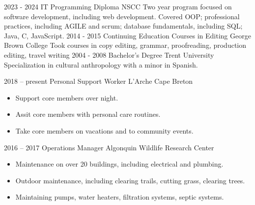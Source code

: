 \documentclass[9pt]{developercv} %
\begin{document}
\vspace{-10 pt}
\begin{entrylist}
    \entry
		{2023 - 2024}
		{IT Programming Diploma}
		{NSCC}
		{Two year program focused on software development, including web development. Covered OOP; professional practices, including AGILE and scrum; database fundamentals, including SQL; Java, C, JavaScript.}
    \entry
		{2014 - 2015}
		{Continuing Education Courses in Editing}
		{George Brown College}
		{Took courses in copy editing, grammar, proofreading, production editing, travel writing}
	\entry
		{2004 - 2008}
		{Bachelor's Degree}
		{Trent University}
		{Specialization in cultural anthropology with a minor in Spanish.}
\end{entrylist}

\vspace{-10 pt}
\begin{entrylist}
	\entry
        {2018 -- present}
		{Personal Support Worker}
		{L'Arche Cape Breton}
		{\vspace{-10pt}
        \begin{itemize}[noitemsep,topsep=0pt,parsep=0pt,partopsep=0pt, leftmargin=-1pt]
            \item Support core members over night.
            \item Assit core members with personal care routines.
            \item Take core members on vacations and to community events.
        \end{itemize} 
        \texttt{} \texttt{}}
	\entry
		{2016 -- 2017}
		{Operations Manager}
		{Algonquin Wildlife Research Center}
		{\vspace{-10pt}
        \begin{itemize}[noitemsep,topsep=0pt,parsep=0pt,partopsep=0pt, leftmargin=-1pt]
            \item Maintenance on over 20 buildings, including electrical and plumbing.
            \item Outdoor maintenance, including clearing trails, cutting grass, clearing trees.
            \item Maintaining pumps, water heaters, filtration systems, septic systems.
        \end{itemize} 
        \texttt{} \texttt{}}
\end{entrylist}
\end{document}
